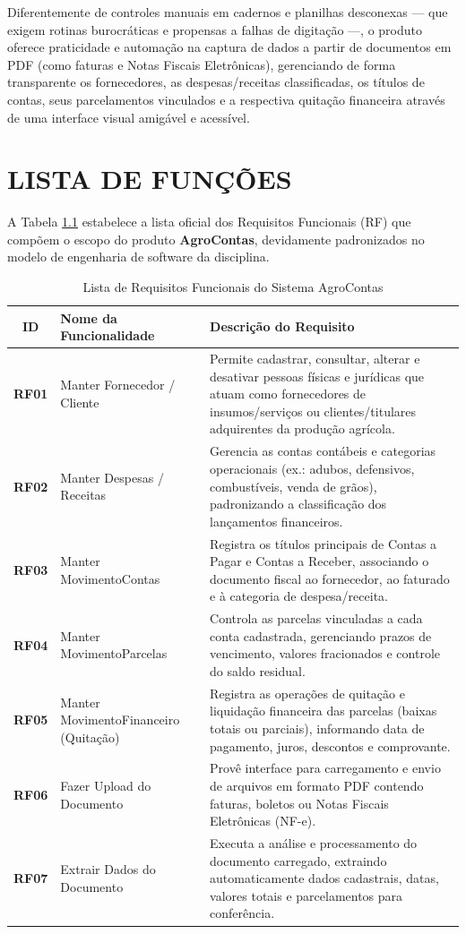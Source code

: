 \documentclass[
	12pt,
	oneside,
	a4paper,
	brazilian
]{abntex2}
\begin{document}
Diferentemente de controles manuais em cadernos e planilhas desconexas — que exigem rotinas burocráticas e propensas a falhas de digitação —, o produto oferece praticidade e automação na captura de dados a partir de documentos em PDF (como faturas e Notas Fiscais Eletrônicas), gerenciando de forma transparente os fornecedores, as despesas/receitas classificadas, os títulos de contas, seus parcelamentos vinculados e a respectiva quitação financeira através de uma interface visual amigável e acessível.

\chapter{LISTA DE FUNÇÕES}

A Tabela \ref{tab:funcoes} estabelece a lista oficial dos Requisitos Funcionais (RF) que compõem o escopo do produto \textbf{AgroContas}, devidamente padronizados no modelo de engenharia de software da disciplina.

\begin{table}[H]
	\centering
	\small
	\caption{Lista de Requisitos Funcionais do Sistema AgroContas}
	\label{tab:funcoes}
	\begin{tabularx}{\textwidth}{c p{5cm} X}
		\toprule
		\textbf{ID} & \textbf{Nome da Funcionalidade} & \textbf{Descrição do Requisito} \\
		\midrule
		\textbf{RF01} & Manter Fornecedor / Cliente & Permite cadastrar, consultar, alterar e desativar pessoas físicas e jurídicas que atuam como fornecedores de insumos/serviços ou clientes/titulares adquirentes da produção agrícola. \\
		\midrule
		\textbf{RF02} & Manter Despesas / Receitas & Gerencia as contas contábeis e categorias operacionais (ex.: adubos, defensivos, combustíveis, venda de grãos), padronizando a classificação dos lançamentos financeiros. \\
		\midrule
		\textbf{RF03} & Manter MovimentoContas & Registra os títulos principais de Contas a Pagar e Contas a Receber, associando o documento fiscal ao fornecedor, ao faturado e à categoria de despesa/receita. \\
		\midrule
		\textbf{RF04} & Manter MovimentoParcelas & Controla as parcelas vinculadas a cada conta cadastrada, gerenciando prazos de vencimento, valores fracionados e controle do saldo residual. \\
		\midrule
		\textbf{RF05} & Manter MovimentoFinanceiro (Quitação) & Registra as operações de quitação e liquidação financeira das parcelas (baixas totais ou parciais), informando data de pagamento, juros, descontos e comprovante. \\
		\midrule
		\textbf{RF06} & Fazer Upload do Documento & Provê interface para carregamento e envio de arquivos em formato PDF contendo faturas, boletos ou Notas Fiscais Eletrônicas (NF-e). \\
		\midrule
		\textbf{RF07} & Extrair Dados do Documento & Executa a análise e processamento do documento carregado, extraindo automaticamente dados cadastrais, datas, valores totais e parcelamentos para conferência. \\
		\bottomrule
	\end{tabularx}
\end{table}
\end{document}
